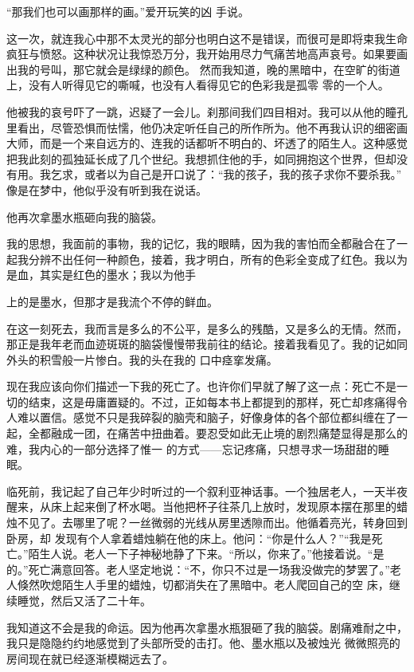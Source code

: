 \documentclass{article}
\begin{document}
“那我们也可以画那样的画。”爱开玩笑的凶
手说。 

这一次，就连我心中那不太灵光的部分也明白这不是错误，而很可是即将束我生命疯狂与愤怒。这种状况让我惊恐万分，我开始用尽力气痛苦地高声哀号。如果要画出我的号叫，那它就会是绿绿的颜色。
\newpage
然而我知道，晚的黑暗中，在空旷的街道上，没有人听得见它的嘶喊，也没有人看得见它的色彩我是孤零
零的一个人。 

他被我的哀号吓了一跳，迟疑了一会儿。刹那间我们四目相对。我可以从他的瞳孔里看出，尽管恐惧而怯懦，他仍决定听任自己的所作所为。他不再我认识的细密画大师，而是一个来自远方的、连我的话都听不明白的、坏透了的陌生人。这种感觉把我此刻的孤独延长成了几个世纪。我想抓住他的手，如同拥抱这个世界，但却没有用。我乞求，或者以为自己是开口说了：“我的孩子，我的孩子求你不要杀我。”
像是在梦中，他似乎没有听到我在说话。 


他再次拿墨水瓶砸向我的脑袋。 

我的思想，我面前的事物，我的记忆，我的眼睛，因为我的害怕而全都融合在了一起我分辨不出任何一种颜色，接着，我才明白，所有的色彩全变成了红色。我以为是血，其实是红色的墨水；我以为他手

\newpage
上的是墨水，但那才是我流个不停的鲜血。 

在这一刻死去，我而言是多么的不公平，是多么的残酷，又是多么的无情。然而，那正是我年老而血迹斑斑的脑袋慢慢带我前往的结论。接着我看见了。我的记如同外头的积雪般一片惨白。我的头在我的
口中痉挛发痛。 

现在我应该向你们描述一下我的死亡了。也许你们早就了解了这一点：死亡不是一切的结束，这是毋庸置疑的。不过，正如每本书上都提到的那样，死亡却疼痛得令人难以置信。感觉不只是我碎裂的脑壳和脑子，好像身体的各个部位都纠缠在了一起，全都融成一团，在痛苦中扭曲着。要忍受如此无止境的剧烈痛楚显得是那么的难，我内心的一部分选择了惟一
的方式——忘记疼痛，只想寻求一场甜甜的睡眠。 

临死前，我记起了自己年少时听过的一个叙利亚神话事。一个独居老人，一天半夜醒来，从床上起来倒了杯水喝。当他把杯子往茶几上放时，发现原本摆在那里的蜡烛不见了。去哪里了呢？一丝微弱的光线从房里透隙而出。他循着亮光，转身回到卧房，却
\newpage
发现有个人拿着蜡烛躺在他的床上。他问：“你是什么人？”“我是死亡。”陌生人说。老人一下子神秘地静了下来。“所以，你来了。”他接着说。“是的。”死亡满意回答。老人坚定地说：“不，你只不过是一场我没做完的梦罢了。”老人倏然吹熄陌生人手里的蜡烛，切都消失在了黑暗中。老人爬回自己的空
床，继续睡觉，然后又活了二十年。 

我知道这不会是我的命运。因为他再次拿墨水瓶狠砸了我的脑袋。剧痛难耐之中，我只是隐隐约约地感觉到了头部所受的击打。他、墨水瓶以及被烛光
微微照亮的房间现在就已经逐渐模糊远去了。 
\end{document}

